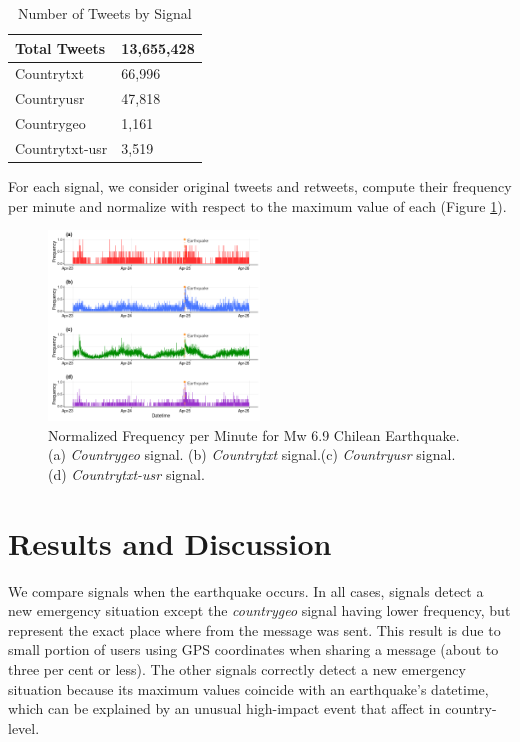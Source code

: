 \documentclass{ewic}
\begin{document}
\begin{table}[]
	\centering
	\caption{Number of Tweets by Signal}
	\begin{tabular}{|l|l|}
		\hline
		Total Tweets    & 13,655,428 \\ \hline
		Countrytxt     & 66,996     \\ \hline
		Countryusr     & 47,818     \\ \hline
		Countrygeo     & 1,161      \\ \hline
		Countrytxt-usr & 3,519      \\ \hline
	\end{tabular}
	
	\label{signalsTweets}
\end{table}

For each signal, we consider original tweets and retweets, compute their frequency per minute and normalize with respect to the maximum value of each (Figure \ref{signalsTweets}).

\begin{figure}[h]
	
	\centering
	\includegraphics[width=0.5\textwidth]{img/freq_per_minute.png}
	\caption{Normalized Frequency per Minute for Mw 6.9 Chilean Earthquake. (a) \textit{Countrygeo} signal. (b) \textit{Countrytxt} signal.(c) \textit{Countryusr} signal. (d) \textit{Countrytxt-usr} signal.}
\end{figure}


\section{Results and Discussion}

We compare signals when the earthquake occurs. In all cases, signals detect a new emergency situation except the \textit{countrygeo} signal having lower frequency, but represent the exact place where from the message was sent. This result is due to small portion of users using GPS coordinates when sharing a message (about to three per cent or less). The other signals correctly detect  a new emergency situation because its maximum values coincide with an earthquake's datetime, which can be explained by an unusual high-impact event that affect in country-level.
\end{document}
